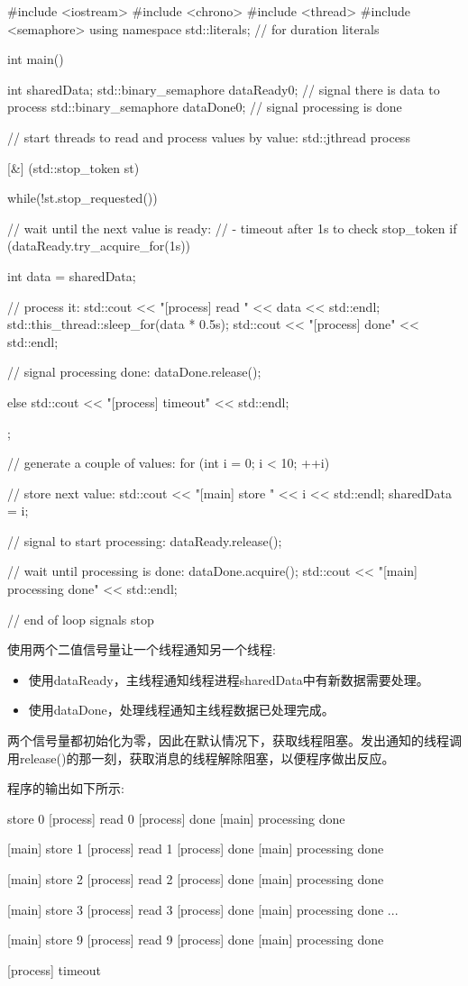 
\begin{cpp}
#include <iostream>
#include <chrono>
#include <thread>
#include <semaphore>
using namespace std::literals; // for duration literals

int main()
{
	int sharedData;
	std::binary_semaphore dataReady{0}; // signal there is data to process
	std::binary_semaphore dataDone{0}; // signal processing is done
	
	// start threads to read and process values by value:
	std::jthread process{[&] (std::stop_token st) {
						while(!st.stop_requested()) {
							// wait until the next value is ready:
							// - timeout after 1s to check stop_token
							if (dataReady.try_acquire_for(1s)) {
								int data = sharedData;
								
								// process it:
								std::cout << "[process] read " << data << std::endl;
								std::this_thread::sleep_for(data * 0.5s);
								std::cout << "[process] done" << std::endl;
								
								// signal processing done:
								dataDone.release();
							}
							else {
								std::cout << "[process] timeout" << std::endl;
							}
							}
						}};
		
	// generate a couple of values:
	for (int i = 0; i < 10; ++i) {
		// store next value:
		std::cout << "[main] store " << i << std::endl;
		sharedData = i;
		
		// signal to start processing:
		dataReady.release();
		
		// wait until processing is done:
		dataDone.acquire();
		std::cout << "[main] processing done\n" << std::endl;
	}
	// end of loop signals stop
}
\end{cpp}

使用两个二值信号量让一个线程通知另一个线程:

\begin{itemize}
\item 
使用dataReady，主线程通知线程进程sharedData中有新数据需要处理。

\item 
使用dataDone，处理线程通知主线程数据已处理完成。
\end{itemize}

两个信号量都初始化为零，因此在默认情况下，获取线程阻塞。发出通知的线程调用release()的那一刻，获取消息的线程解除阻塞，以便程序做出反应。

程序的输出如下所示:

\begin{shell}
[main] store 0
[process] read 0
[process]      done
[main] processing done

[main] store 1
[process] read 1
[process]      done
[main] processing done

[main] store 2
[process] read 2
[process]      done
[main] processing done

[main] store 3
[process] read 3
[process]      done
[main] processing done
...

[main] store 9
[process] read 9
[process]      done
[main] processing done

[process] timeout
\end{shell}

